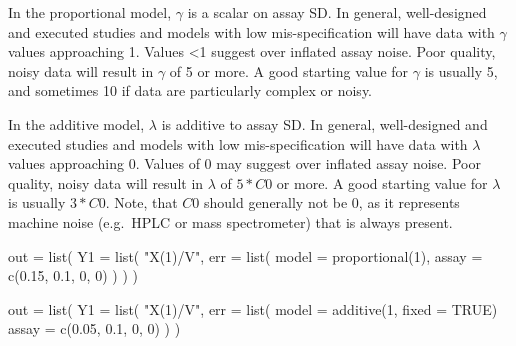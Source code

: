 \documentclass[
]{book}
\newenvironment{Shaded}{\begin{snugshade}}{\end{snugshade}}
\newcommand{\AttributeTok}[1]{\textcolor[rgb]{0.77,0.63,0.00}{#1}}
\newcommand{\ConstantTok}[1]{\textcolor[rgb]{0.00,0.00,0.00}{#1}}
\newcommand{\DecValTok}[1]{\textcolor[rgb]{0.00,0.00,0.81}{#1}}
\newcommand{\FloatTok}[1]{\textcolor[rgb]{0.00,0.00,0.81}{#1}}
\newcommand{\FunctionTok}[1]{\textcolor[rgb]{0.00,0.00,0.00}{#1}}
\newcommand{\NormalTok}[1]{#1}
\newcommand{\OtherTok}[1]{\textcolor[rgb]{0.56,0.35,0.01}{#1}}
\newcommand{\StringTok}[1]{\textcolor[rgb]{0.31,0.60,0.02}{#1}}
\begin{document}
In the proportional model, \(\gamma\) is a scalar on assay SD. In general,
well-designed and executed studies and models with low mis-specification will have data with \(\gamma\) values approaching 1. Values \textless1 suggest over inflated assay noise. Poor quality, noisy data will result in \(\gamma\) of 5 or more. A good starting value for \(\gamma\) is usually 5, and sometimes 10 if data are particularly complex or noisy.

In the additive model, \(\lambda\) is additive to assay SD. In general,
well-designed and executed studies and models with low mis-specification will have data with \(\lambda\) values approaching 0. Values of 0 may suggest over inflated assay noise. Poor quality, noisy data will result in \(\lambda\) of \(5*C0\) or more. A good starting value for \(\lambda\) is usually \(3*C0\). Note, that \(C0\)
should generally not be 0, as it represents machine noise (e.g.~HPLC or
mass spectrometer) that is always present.

\begin{Shaded}
\begin{Highlighting}[]
\NormalTok{out }\OtherTok{=} \FunctionTok{list}\NormalTok{(}
  \AttributeTok{Y1 =} \FunctionTok{list}\NormalTok{(}
    \StringTok{"X(1)/V"}\NormalTok{,}
    \AttributeTok{err =} \FunctionTok{list}\NormalTok{(}
      \AttributeTok{model =} \FunctionTok{proportional}\NormalTok{(}\DecValTok{1}\NormalTok{),}
      \AttributeTok{assay =} \FunctionTok{c}\NormalTok{(}\FloatTok{0.15}\NormalTok{, }\FloatTok{0.1}\NormalTok{, }\DecValTok{0}\NormalTok{, }\DecValTok{0}\NormalTok{)}
\NormalTok{    )}
\NormalTok{  )}
\NormalTok{)}
\end{Highlighting}
\end{Shaded}

\begin{Shaded}
\begin{Highlighting}[]
\NormalTok{out }\OtherTok{=} \FunctionTok{list}\NormalTok{(}
  \AttributeTok{Y1 =} \FunctionTok{list}\NormalTok{(}
    \StringTok{"X(1)/V"}\NormalTok{,}
    \AttributeTok{err =} \FunctionTok{list}\NormalTok{(}
      \AttributeTok{model =} \FunctionTok{additive}\NormalTok{(}\DecValTok{1}\NormalTok{, }\AttributeTok{fixed =} \ConstantTok{TRUE}\NormalTok{)}
      \AttributeTok{assay =} \FunctionTok{c}\NormalTok{(}\FloatTok{0.05}\NormalTok{, }\FloatTok{0.1}\NormalTok{, }\DecValTok{0}\NormalTok{, }\DecValTok{0}\NormalTok{)}
\NormalTok{    )}
\NormalTok{)}
\end{Highlighting}
\end{Shaded}
\end{document}
